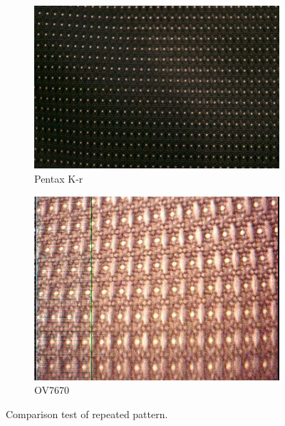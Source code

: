 \begin{figure}
\centering
\begin{subfigure}{.5\textwidth}
  \centering
  \includegraphics[width=1\linewidth]{./img/pentax_texture.jpg}
  \caption{Pentax K-r}
\end{subfigure}%
\begin{subfigure}{.5\textwidth}
  \centering
  \includegraphics[width=1\linewidth]{./img/ov7670_texture.jpg}
  \caption{OV7670}
\end{subfigure}
\caption{Comparison test of repeated pattern.}
\label{fig:texture_capture}
\end{figure}

